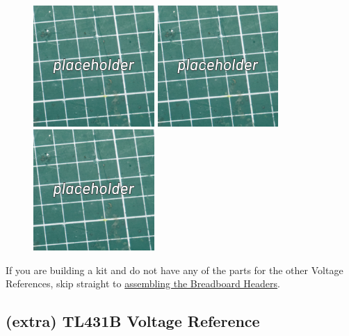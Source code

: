 \documentclass[12pt, a4paper]{article}
\begin{document}
\begin{figure}[H]
    \centering
    \includegraphics[width=46mm]{images/placeholder.jpg}
    \hspace{2mm}
    \includegraphics[width=46mm]{images/placeholder.jpg}
    \hspace{2mm}
    \includegraphics[width=46mm]{images/placeholder.jpg}
\end{figure}

If you are building a kit and do not have any of the parts for the other Voltage References,
skip straight to \hyperref[sec:breadboard_headers]{assembling the Breadboard Headers}.

\pagebreak
\subsection{\smaller (extra) \enspace \larger TL431B Voltage Reference}
\end{document}
